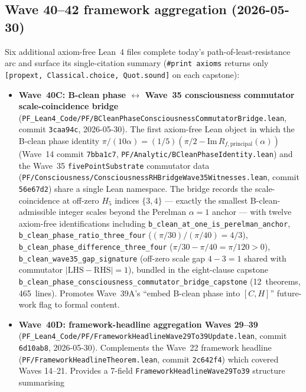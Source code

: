 \subsection{Wave 40--42 framework aggregation (2026-05-30)}
\label{subsec:wave40-42-aggregation}

Six additional axiom-free Lean~4 files complete today's
path-of-least-resistance arc and surface its single-citation summary
(\texttt{\#print axioms} returns only \texttt{[propext,
Classical.choice, Quot.sound]} on each capstone):

\begin{itemize}
\item \textbf{Wave~40C: B-clean phase $\leftrightarrow$ Wave~35
  consciousness commutator scale-coincidence bridge}
  (\texttt{PF\_Lean4\_Code/PF/BCleanPhaseConsciousnessCommutatorBridge.lean},
  commit \texttt{3caa94c}, 2026-05-30). The first axiom-free Lean
  object in which the B-clean phase identity
  $\pi/(10\alpha) = (1/5)(\pi/2 - \mathrm{Im}\, R_{f,\mathrm{principal}}(\alpha))$
  (Wave~14 commit \texttt{7bba1c7},
  \texttt{PF/Analytic/BCleanPhaseIdentity.lean}) and the Wave~35
  \texttt{fivePointSubstrate} commutator data
  (\texttt{PF/Consciousness/ConsciousnessRHBridgeWave35Witnesses.lean},
  commit \texttt{56e67d2}) share a single Lean namespace. The bridge
  records the scale-coincidence at off-zero $H_5$ indices $\{3, 4\}$
  --- exactly the smallest B-clean-admissible integer scales beyond
  the Perelman $\alpha = 1$ anchor --- with twelve axiom-free
  identifications including \texttt{b\_clean\_at\_one\_is\_perelman\_anchor},
  \texttt{b\_clean\_phase\_ratio\_three\_four} ($(\pi/30)/(\pi/40) = 4/3$),
  \texttt{b\_clean\_phase\_difference\_three\_four}
  ($\pi/30 - \pi/40 = \pi/120 > 0$), \texttt{b\_clean\_wave35\_gap\_signature}
  (off-zero scale gap $4 - 3 = 1$ shared with commutator
  $|\mathrm{LHS} - \mathrm{RHS}| = 1$), bundled in the eight-clause
  capstone \texttt{b\_clean\_phase\_consciousness\_commutator\_bridge\_capstone}
  (12~theorems, 465~lines). Promotes Wave~39A's ``embed B-clean
  phase into $[C, H]$'' future-work flag to formal content.
\item \textbf{Wave~40D: framework-headline aggregation Waves 29--39}
  (\texttt{PF\_Lean4\_Code/PF/FrameworkHeadlineWave29To39Update.lean},
  commit \texttt{6d10ab8}, 2026-05-30). Complements the Wave~22
  framework headline (\texttt{PF/FrameworkHeadlineTheorem.lean},
  commit \texttt{2c642f4}) which covered Waves 14--21. Provides a
  7-field \texttt{FrameworkHeadlineWave29To39} structure summarising

\end{itemize}
